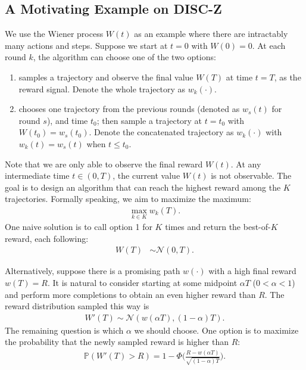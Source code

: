 \subsection{A Motivating Example on DISC-Z}
\vspace{-0.1cm}  
We use the Wiener process $W(t)$ as an example where there are intractably many actions and steps. Suppose we start at $t=0$ with $W(0) = 0$. 
At each round $k$, the algorithm can choose one of the two options:
\begin{enumerate}[leftmargin=*,itemsep=0pt,topsep=0pt,parsep=0pt, partopsep=0pt]
    \item samples a trajectory and observe the final value $W(T)$ at time $t=T$, as the reward signal. Denote the whole trajectory as $w_k(\cdot)$.
    \item chooses one trajectory from the previous rounds (denoted as $w_s(t)$ for round $s$), and time $t_0$; then sample a trajectory at $t=t_0$ with $W(t_0)=w_s(t_0)$. Denote the concatenated trajectory as $w_k(\cdot)$ with $w_k(t)=w_s(t)$ when $t\le t_0$.
\end{enumerate}
Note that we are only able to observe the final reward $W(t)$. At any intermediate time $t \in (0, T)$, the current value $W(t)$ is not observable. The goal is to design an algorithm that can reach the highest reward among the $K$ trajectories. Formally speaking, we aim to maximize the maximum:
\begin{align*}
    \max_{k \in K} w_k(T).
\end{align*}
One naive solution is to call option 1 for $K$ times and return the best-of-$K$ reward, each following:
\begin{align*}
    W(T) & \sim \mathcal{N}(0, T).
\end{align*}


Alternatively, suppose there is a promising path $w(\cdot)$ with a high final reward $w(T)=R$.
It is natural to consider starting at some midpoint $\alpha T$ ($0 < \alpha < 1$) and perform more completions to obtain an even higher reward than $R$. 
The reward distribution sampled this way is
\begin{align*}
    W'(T) \sim \mathcal{N}(w(\alpha T) , (1-\alpha)T).
\end{align*}
The remaining question is which $\alpha$ we should choose. One option is to maximize the probability that the newly sampled reward is higher than $R$:
\begin{align*}
    \mathbb{P}(W'(T) > R) = 1 - \Phi\bigg(  
    \frac{R - w(\alpha T)}{\sqrt{(1-\alpha)T}}
    \bigg).
\end{align*}


